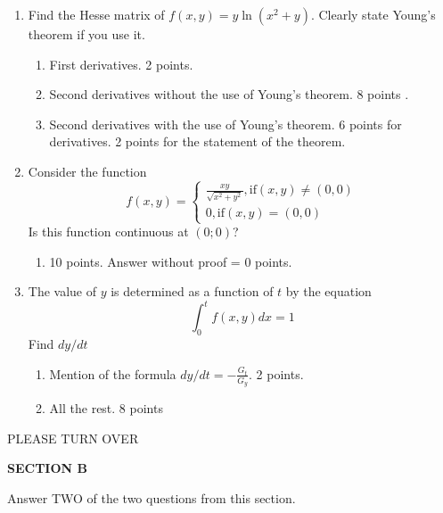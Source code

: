 \documentclass[pdftex,12pt,a4paper]{article}
\begin{document}
\begin{enumerate}
\item Find the Hesse matrix of $f(x,y)=y\ln(x^2+y)$. Clearly state Young's theorem if you use it. 

\begin{enumerate}
\item First derivatives. 2 points.
\item Second derivatives without the use of Young's theorem. 8 points . 
\item Second derivatives with the use of Young's theorem. 6 points for derivatives. 2 points for the statement of the theorem. 
\end{enumerate}



\item Consider the function 
\begin{equation}
f(x,y)=
\begin{cases}
	\frac{xy}{\sqrt{x^2+y^2}}, \mbox{if} (x,y)\neq (0,0) \\
	0, \mbox{if} (x,y)=(0,0)
\end{cases}
\end{equation}
Is this function continuous at $(0;0)$? 

\begin{enumerate}
\item 10 points. Answer without proof = 0 points.
\end{enumerate}


\item The value of $y$ is determined as a function of $t$ by the equation
\begin{equation}
\int_{0}^{t}f(x,y)dx=1
\end{equation}
Find $dy/dt$

\begin{enumerate}
\item Mention of the formula $dy/dt=-\frac{G_t}{G_y}$. 2 points.
\item All the rest. 8 points
\end{enumerate}


\end{enumerate}

PLEASE TURN OVER

\textbf{SECTION B}

Answer TWO of the two questions from this section.
\end{document}
